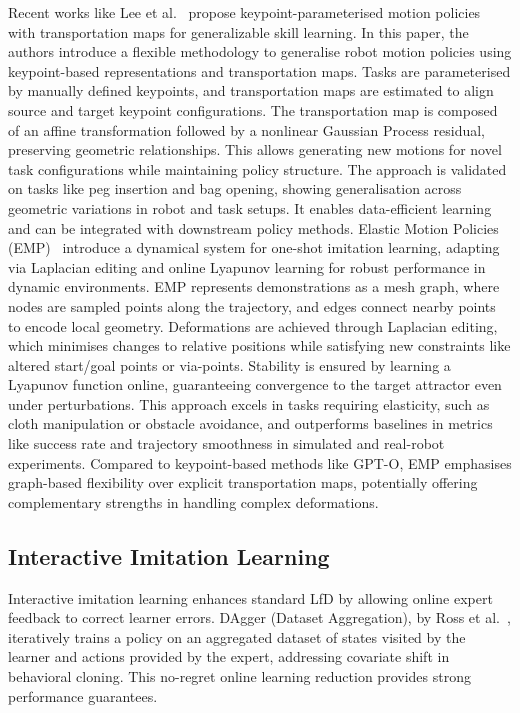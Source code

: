 \documentclass[a4paper, 10pt, conference]{ieeeconf}
\begin{document}
Recent works like Lee et al.~\cite{lee2024generalizable} propose keypoint-parameterised motion policies with transportation maps for generalizable skill learning.
In this paper, the authors introduce a flexible methodology to generalise robot motion policies using keypoint-based representations and transportation maps.
Tasks are parameterised by manually defined keypoints, and transportation maps are estimated to align source and target keypoint configurations.
The transportation map is composed of an affine transformation followed by a nonlinear Gaussian Process residual, preserving geometric relationships.
This allows generating new motions for novel task configurations while maintaining policy structure.
The approach is validated on tasks like peg insertion and bag opening, showing generalisation across geometric variations in robot and task setups.
It enables data-efficient learning and can be integrated with downstream policy methods.
Elastic Motion Policies (EMP)~\cite{li2025elastic} introduce a dynamical system for one-shot imitation learning, adapting via Laplacian editing and online Lyapunov learning for robust performance in dynamic environments.
EMP represents demonstrations as a mesh graph, where nodes are sampled points along the trajectory, and edges connect nearby points to encode local geometry.
Deformations are achieved through Laplacian editing, which minimises changes to relative positions while satisfying new constraints like altered start/goal points or via-points.
Stability is ensured by learning a Lyapunov function online, guaranteeing convergence to the target attractor even under perturbations.
This approach excels in tasks requiring elasticity, such as cloth manipulation or obstacle avoidance, and outperforms baselines in metrics like success rate and trajectory smoothness in simulated and real-robot experiments.
Compared to keypoint-based methods like GPT-O, EMP emphasises graph-based flexibility over explicit transportation maps, potentially offering complementary strengths in handling complex deformations.

\subsection{Interactive Imitation Learning}

Interactive imitation learning enhances standard LfD by allowing online expert feedback to correct learner errors.
DAgger (Dataset Aggregation), by Ross et al.~\cite{ross2011reduction}, iteratively trains a policy on an aggregated dataset of states visited by the learner and actions provided by the expert, addressing covariate shift in behavioral cloning.
This no-regret online learning reduction provides strong performance guarantees.
\end{document}
